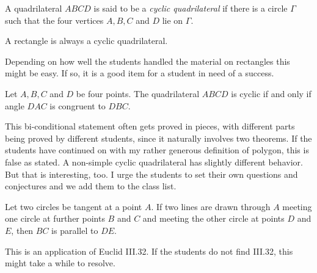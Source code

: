 \begin{definition}\label{defn:cyclic-quad}
A quadrilateral $ABCD$ is said to be a \emph{cyclic quadrilateral} if there is a circle $\Gamma$ such that the four vertices $A,B,C$ and $D$ lie on $\Gamma$.
\end{definition}

\begin{conjecture}\label{conj:rect-cyclic}
A rectangle is always a cyclic quadrilateral.
\end{conjecture}

\begin{annotation}
{
\color{blue}
Depending on how well the students handled the material on rectangles this might be easy. If so, it is a good item for a student in need of a success.
}
\end{annotation}

\begin{conjecture}\label{conj:angles-cyclic-quad}
Let $A,B,C$ and $D$ be four points. The quadrilateral $ABCD$ is cyclic if and only if angle $DAC$ is congruent to $DBC$.
\end{conjecture}

\begin{annotation}
{
\color{blue}
This bi-conditional statement often gets proved in pieces, with different parts being proved by different students, since it naturally involves two theorems. If the students have continued on with my rather generous definition of polygon, this is false as stated. A non-simple cyclic quadrilateral has slightly different behavior. But that is interesting, too. I urge the students to set their own questions and conjectures and we add them to the class list.
}
\end{annotation}

\begin{conjecture}\label{conj:tangent-to-two-circles}
Let two circles be tangent at a point $A$. If two lines are drawn through $A$ meeting one circle at further points $B$ and $C$ and meeting the other circle at points $D$ and $E$, then $BC$ is parallel to $DE$.
\end{conjecture}

\begin{annotation}
{
\color{blue}
This is an application of Euclid III.32. If the students do not find III.32, this might take a while to resolve.
}
\end{annotation}

